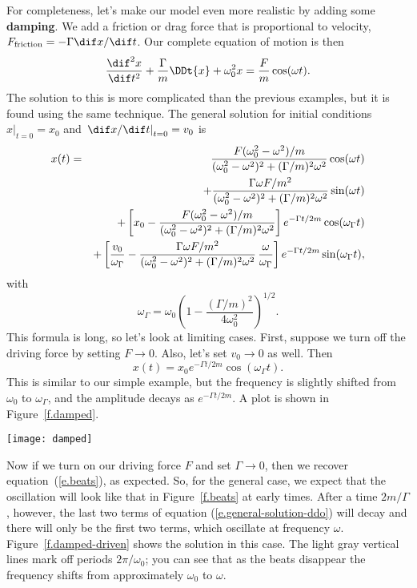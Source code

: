 For completeness, let's make our model even more realistic by adding some \textbf{damping}.  We add a friction or drag force that is proportional to velocity, $F_{\mathrm{friction}} = -\Gamma \dif x/\dif t$. Our complete equation of motion is then
\begin{equation}
	\DDtt{x} + \frac{\Gamma}{m} \DDt{x} + \omega_{0}^{2}x = \frac{F}{m}\cos(\omega t).
\end{equation}
The solution to this is more complicated than the previous examples, but it is found using the same technique.  The general solution for initial conditions $\left.x\right|_{t=0} = x_{0}$ and $\left.\dif x/\dif t\right|_{t=0} = v_{0}$ is
\begin{eqnarray}
\label{e.general-solution-ddo}
x(t) &=& \frac{F(\omega_{0}^{2}-\omega^{2})/m}{(\omega_{0}^{2}-\omega^{2})^{2}+(\Gamma/m)^{2}\omega^{2}}\cos(\omega t) \\
	&& + \frac{\Gamma\omega F/m^{2}}{(\omega_{0}^{2}-\omega^{2})^{2}+(\Gamma/m)^{2}\omega^{2}}\sin(\omega t)\nonumber \\
	&& + \left[x_{0}-\frac{F(\omega_{0}^{2}-\omega^{2})/m}{(\omega_{0}^{2}-\omega^{2})^{2}+(\Gamma/m)^{2}\omega^{2}}\right]e^{-\Gamma t/2m} \cos(\omega_{\Gamma}t) \nonumber\\
	&& + \left[\frac{v_{0}}{\omega_{\Gamma}}-\frac{\Gamma\omega F/m^{2}}{(\omega_{0}^{2}-\omega^{2})^{2}+(\Gamma/m)^{2}\omega^{2}}
	\,\frac{\omega}{\omega_{\Gamma}}\right]e^{-\Gamma t/2m} \sin(\omega_{\Gamma}t), 
	\nonumber
\end{eqnarray}
with
\[ \omega_{\Gamma} = \omega_{0}\left(1-\frac{(\Gamma/m)^{2}}{4\omega_{0}^{2}}\right)^{1/2}. \]
This formula is long, so let's look at limiting cases.  First, suppose we turn off the driving force by setting $F\to 0$. Also, let's set $v_{0}\to0$ as well. Then
\[
	x(t) = x_{0}e^{-\Gamma t/2m} \cos\left(\omega_{\Gamma}t\right).
\]
This is similar to our simple example, but the frequency is slightly shifted from $\omega_{0}$ to $\omega_{\Gamma}$,
and the amplitude decays as $e^{-\Gamma t/2m}$. A plot is shown in Figure~\ref{f.damped}.

\begin{figure*}[ht]
\texttt{[image: damped]}
\caption[A damped oscillator]{A damped oscillator, with frequency $\omega_{0} = 2\pi$ and damping constant $\Gamma/m = 0.04\pi$. The light gray vertical lines indicate the period $2\pi/\omega_{0}$.
\label{f.damped}}
\end{figure*}

Now if we turn on our driving force $F$ and set $\Gamma\to0$, then we recover equation~(\ref{e.beats}), as expected. So, for the general case, we expect that the oscillation will look like that in Figure~\ref{f.beats} at early times. After a time $2m/\Gamma$, however, the last two terms of equation (\ref{e.general-solution-ddo}) will decay and there will only be the first two terms, which oscillate at frequency $\omega$.  Figure~\ref{f.damped-driven} shows the solution in this case.  The light gray vertical lines mark off periods $2\pi/\omega_{0}$; you can see that as the beats disappear the frequency shifts from approximately $\omega_{0}$ to $\omega$.

